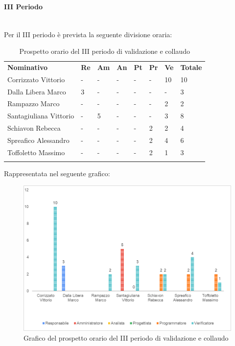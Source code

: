 \paragraph{III Periodo} \mbox{} \\
Per il III periodo è prevista la seguente divisione oraria:
\begin{longtable} {				
		>{}p{40mm}  
		>{}p{8mm}
		>{}p{8mm}
		>{}p{8mm}
		>{}p{8mm}
		>{}p{8mm}
		>{}p{8mm}
		>{}p{12mm}				
	}			
	\rowcolor{gray!50}
	\textbf{Nominativo} & \textbf{Re} & \textbf{Am} & \textbf{An} & \textbf{Pt} & \textbf{Pr} & \textbf{Ve} & \textbf{Totale}	\TBstrut \\ [2mm]
	Corrizzato Vittorio & - & - & - & - & - & 10 & 10 \TBstrut \\ [2mm]
	Dalla Libera Marco & 3 & - & - & - & - & - & 3 \TBstrut \\ [2mm]
	Rampazzo Marco & - & - & - & - & - & 2 & 2 \TBstrut \\ [2mm]
	Santagiuliana Vittorio & - & 5 & - & - & - & 3 & 8 \TBstrut \\ [2mm]
	Schiavon Rebecca & - & - & - & - & 2 & 2 & 4 \TBstrut \\ [2mm]
	Spreafico Alessandro & - & - & - & - & 2 & 4 & 6 \TBstrut \\ [2mm]
	Toffoletto Massimo & - & - & - & - & 2 & 1 & 3 \TBstrut \\ [2mm]
	\rowcolor{white}
	\caption{Prospetto orario del III periodo di validazione e collaudo}
\end{longtable}
Rappresentata nel seguente grafico:
\begin{figure} [H]
	\includegraphics[width=\linewidth]{./img/Grafici/ra3.png}
	\caption{Grafico del prospetto orario del III periodo di validazione e collaudo}
\end{figure}
\pagebreak
